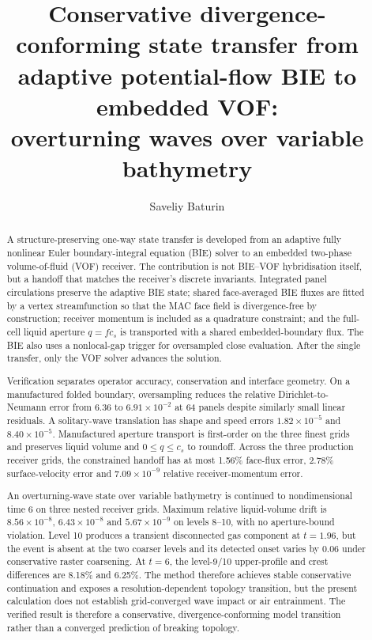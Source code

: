 \documentclass[11pt]{article}
\title{Conservative divergence-conforming state transfer from adaptive
potential-flow BIE to embedded VOF:\\overturning waves over variable bathymetry}
\author{Saveliy Baturin}
\date{}
\begin{document}
\maketitle

\begin{abstract}
A structure-preserving one-way state transfer is developed from an adaptive
fully nonlinear Euler boundary-integral equation (BIE) solver to an embedded
two-phase volume-of-fluid (VOF) receiver.  The contribution is not BIE--VOF
hybridisation itself, but a handoff that matches the receiver's discrete
invariants.  Integrated panel circulations preserve the adaptive BIE state;
shared face-averaged BIE fluxes are fitted by a vertex streamfunction so that
the MAC face field is divergence-free by construction; receiver momentum is
included as a quadrature constraint; and the full-cell liquid aperture
$q=f c_s$ is transported with a shared embedded-boundary flux.  The BIE also
uses a nonlocal-gap trigger for oversampled close evaluation.  After the
single transfer, only the VOF solver advances the solution.

Verification separates operator accuracy, conservation and interface
geometry.  On a manufactured folded boundary, oversampling reduces the
relative Dirichlet-to-Neumann error from 6.36 to $6.91\times10^{-2}$ at 64
panels despite similarly small linear residuals.  A solitary-wave translation
has shape and speed errors $1.82\times10^{-5}$ and
$8.40\times10^{-5}$.  Manufactured aperture transport is first-order on the
three finest grids and preserves liquid volume and $0\le q\le c_s$ to
roundoff.  Across the three production receiver grids, the constrained
handoff has at most 1.56\% face-flux error, 2.78\% surface-velocity error and
$7.09\times10^{-9}$ relative receiver-momentum error.

An overturning-wave state over variable bathymetry is continued to
nondimensional time 6 on three nested
receiver grids.  Maximum relative liquid-volume drift is
$8.56\times10^{-8}$, $6.43\times10^{-8}$ and $5.67\times10^{-9}$ on levels
8--10, with no aperture-bound violation.  Level 10 produces a transient
disconnected gas component at $t=1.96$, but the event is absent at the two
coarser levels and its detected onset varies by 0.06 under conservative raster
coarsening.  At $t=6$, the level-9/10 upper-profile and crest differences are
8.18\% and 6.25\%.  The method therefore achieves stable conservative
continuation and exposes a resolution-dependent topology transition, but the
present calculation does not establish grid-converged wave impact or air
entrainment.  The verified result is therefore a conservative,
divergence-conforming model transition rather than a converged prediction of
breaking topology.
\end{abstract}
\end{document}

